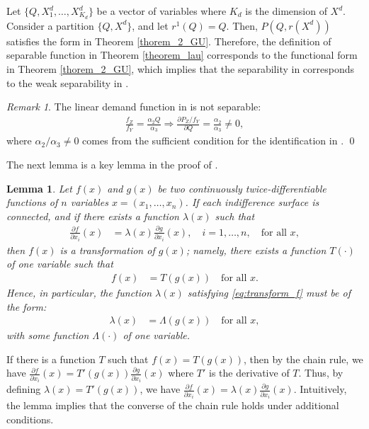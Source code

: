 \documentclass[11pt, a4paper]{article}
\newtheorem{lemma}{Lemma}
\theoremstyle{remark}
\newtheorem{remark}{Remark}
\begin{document}
Let $\{Q,X_{1}^{d}, \ldots,  X_{K_d}^{d}\}$ be a vector of variables where $K_d$ is the dimension of $X^{d}$.
Consider a partition $\{Q, X^{d}\}$, and let $r^1(Q) = Q$.
Then, $P(Q, r(X^{d}))$ satisfies the form in Theorem \ref{thorem_2_GU}.
Therefore, the definition of separable function in Theorem \ref{theorem_lau} corresponds to the functional form in  Theorem \ref{thorem_2_GU}, which implies that the separability in \citet{lau1982identifying} corresponds to the weak separability in \citet{goldmanNote1964}.

\begin{remark}
    The linear demand function in \citet{bresnahan1982oligopoly} is not separable:
    \begin{align}
        \frac{f_Z}{f_Y} = \frac{\alpha_2 Q}{\alpha_3} \Longrightarrow \frac{\partial P_Z/f_Y}{\partial Q} = \frac{\alpha_2}{\alpha_3} \ne 0,
    \end{align}
    where $\alpha_2/\alpha_3 \ne 0$ comes from the sufficient condition for the identification in \citet{matsumura2023resolving}.
    \qed
\end{remark}


The next lemma is a key lemma in the proof of \citet{lau1982identifying}.
\begin{framed}
\begin{lemma}\label{lemma_1_GU}
    Let $f(x)$ and $g(x)$ be two continuously twice-differentiable functions of $n$ variables $x=(x_1, \dots, x_n)$. If each indifference surface is connected, and if there exists a function $\lambda(x)$ such that
    \begin{align}
    \frac{\partial f}{\partial x_i}(x) &= \lambda(x)\frac{\partial g}{\partial x_i}(x), \quad i=1, \dots, n, \quad \text{for all } x, \label{eq:transform_f}
    \end{align}
    then $f(x)$ is a transformation of $g(x)$; namely, there exists a function $T(\cdot)$ of one variable such that
    \begin{align}
    f(x) &= T(g(x)) \quad \text{for all } x.
    \end{align}
    Hence, in particular, the function $\lambda(x)$ satisfying \eqref{eq:transform_f} must be of the form:
    \begin{align}
        \lambda(x) &= \Lambda(g(x)) \quad \text{for all } x, \label{eq:form_of_lambda}
    \end{align}
    with some function $\Lambda(\cdot)$ of one variable.
\end{lemma}
\end{framed}
If there is a function $T$ such that $f(x) = T(g(x))$, then by the chain rule, we have $\frac{\partial f}{\partial x_i}(x) = T'(g(x))\frac{\partial g}{\partial x_i}(x)$ where $T'$ is the derivative of $T$.
Thus, by defining $\lambda(x) = T'(g(x))$, we have $\frac{\partial f}{\partial x_i}(x) = \lambda(x)\frac{\partial g}{\partial x_i}(x)$.
Intuitively, the lemma implies that the converse of the chain rule holds under additional conditions.
\end{document}

